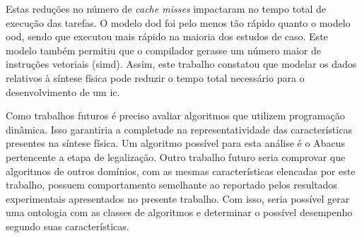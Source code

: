 Estas reduções no número de  \textit{cache misses} impactaram no tempo total de execução das tarefas.
O modelo \ac{dod} foi pelo menos tão rápido quanto o modelo \ac{ood}, sendo que executou mais rápido na maioria dos estudos de caso.
Este modelo também permitiu que o compilador gerasse um número maior de instruções vetoriais (\ac{simd}).
Assim, este trabalho constatou que modelar os dados relativos à síntese física pode reduzir o tempo total necessário para o desenvolvimento de um \ac{ic}.

Como trabalhos futuros é preciso avaliar algoritmos que utilizem programação dinâmica.
Isso garantiria a completude na representatividade das características presentes na síntese física.
Um algoritmo possível para esta análise é o Abacus~\cite{spindler2008abacus} pertencente a etapa de legalização.
Outro trabalho futuro seria comprovar que algoritmos de outros domínios, com as mesmas características elencadas por este trabalho, possuem comportamento semelhante ao reportado pelos resultados experimentais apresentados no presente trabalho. Com isso, seria possível gerar uma ontologia com as classes de algoritmos e determinar o possível desempenho segundo suas características.
